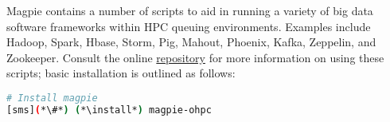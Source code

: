 Magpie contains a number of scripts to aid in running a variety of big data software
frameworks within HPC queuing environments. Examples include Hadoop, Spark, Hbase, Storm, Pig,
Mahout, Phoenix, Kafka, Zeppelin, and Zookeeper.  Consult the online
\href{https://github.com/LLNL/magpie}{\color{blue}repository} for
more information on using these scripts; basic installation is outlined as follows:

\begin{lstlisting}[language=bash,keywords={},upquote=true]
# Install magpie
[sms](*\#*) (*\install*) magpie-ohpc
\end{lstlisting}

